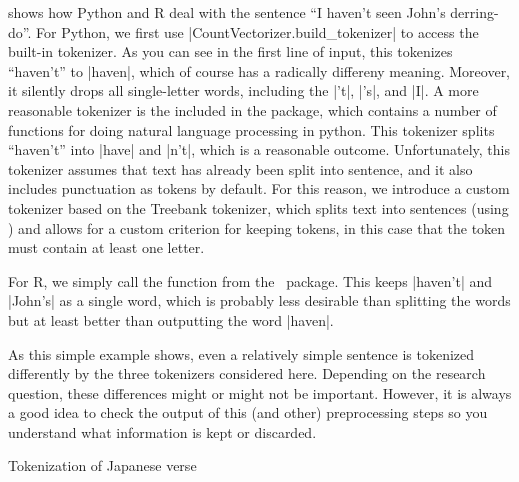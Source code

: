  shows how Python and R deal with the sentence ``I haven't seen John's derring-do''.
For Python, we first use |CountVectorizer.build_tokenizer| to access the built-in tokenizer.
As you can see in the first line of input, this tokenizes ``haven't'' to |haven|,
which of course has a radically differeny meaning. Moreover, it silently drops all single-letter words,
including the |'t|, |'s|, and |I|.
A more reasonable tokenizer is the  included in the  package, which contains a number of functions for doing natural language processing in python.
This tokenizer splits ``haven't'' into |have| and |n't|, which is a reasonable outcome.
Unfortunately, this tokenizer assumes that text has already been split into sentence,
and it also includes punctuation as tokens by default.
For this reason, we introduce a custom tokenizer based on the Treebank tokenizer,
which splits text into sentences (using ) and allows for a custom criterion for keeping tokens,
in this case that the token must contain at least one letter. 

For R, we simply call the  function from the \quanteda\ package.
This keeps |haven't| and |John's| as a single word, which is probably less desirable than splitting the words
but at least better than outputting the word |haven|.

As this simple example shows, even a relatively simple sentence is tokenized differently by the three tokenizers considered here.
Depending on the research question, these differences might or might not be important.
However, it is always a good idea to check the output of this (and other) preprocessing steps so you understand
what information is kept or discarded.

\begin{ccsexample}
  \begin{tcbraster}[raster columns=2,raster equal height=rows,raster valign=top]
  \begin{tcolorbox}[title=Python Output]
      \texttt{[image: \{ch\_dtm/haiku.py]}.png}
  \end{tcolorbox}%
  \begin{tcolorbox}[title=R Output]
      \texttt{[image: \{ch\_dtm/haiku.r]}.png}
  \end{tcolorbox}%
\end{tcbraster}
  \caption{Tokenization of Japanese verse}\label{ex:haiku}
\end{ccsexample}



